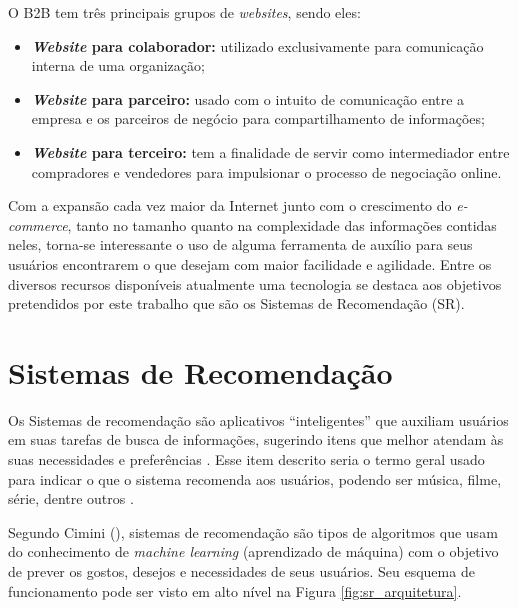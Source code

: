 O B2B tem três principais grupos de \textit{websites}, sendo eles:
\begin{itemize}
    \item \textbf{\textit{Website} para colaborador:} utilizado exclusivamente para comunicação interna de uma organização;
    
    \item \textbf{\textit{Website} para parceiro:} usado com o intuito de comunicação entre a empresa e os parceiros de negócio para compartilhamento de informações;
    
    \item \textbf{\textit{Website} para terceiro:} tem a finalidade de servir como intermediador entre compradores e vendedores para impulsionar o processo de negociação online.
    
\end{itemize}

Com a expansão cada vez maior da Internet junto com o crescimento do \textit{e-commerce}, tanto no tamanho quanto na complexidade das informações contidas neles, torna-se interessante o uso de alguma ferramenta de auxílio para seus usuários encontrarem o que desejam com maior facilidade e agilidade. Entre os diversos recursos disponíveis atualmente uma tecnologia se destaca aos objetivos pretendidos por este trabalho que são os Sistemas de Recomendação (SR).

\section{Sistemas de Recomendação}
\label{SR}

Os Sistemas de recomendação são aplicativos “inteligentes'' que auxiliam usuários em suas tarefas de busca de informações, sugerindo itens que melhor atendam às suas necessidades e preferências \cite{Mahmood:2009:IRS:1557914.1557930}. Esse item descrito seria o termo geral usado para indicar o que o sistema recomenda aos usuários, podendo ser música, filme, série, dentre outros \cite{Ricci:2010}.

Segundo Cimini (\citeyear{Cimini:2019}), sistemas de recomendação são tipos de algoritmos que usam do conhecimento de \textit{machine learning} (aprendizado de máquina) com o objetivo de prever os gostos, desejos e necessidades de seus usuários. Seu esquema de funcionamento pode ser visto em alto nível na Figura \ref{fig:sr_arquitetura}.

